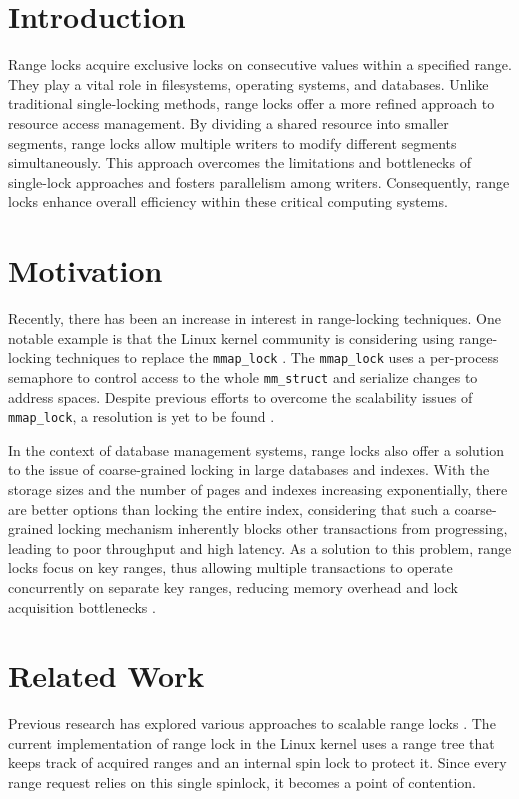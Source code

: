 \section{Introduction}

Range locks acquire exclusive locks on consecutive values within a specified range. They play a vital role in filesystems, operating systems, and databases\parencite{readerWriterLocks2017, lockingBTreeIndex2020, concurrentFileSystem2021}. Unlike traditional single-locking methods, range locks offer a more refined approach to resource access management. By dividing a shared resource into smaller segments, range locks allow multiple writers to modify different segments simultaneously. This approach overcomes the limitations and bottlenecks of single-lock approaches and fosters parallelism among writers. Consequently, range locks enhance overall efficiency within these critical computing systems.

\section{Motivation}
Recently, there has been an increase in interest in range-locking techniques. One notable example is that the Linux kernel community is considering using range-locking techniques to replace the \texttt{mmap\_lock} \parencite{readerWriterLocks2017, mapleTree2021, mmapLock2022}. The \texttt{mmap\_lock} uses a per-process semaphore to control access to the whole \texttt{mm\_struct} \parencite{mmstruct2023} and serialize changes to address spaces.  Despite previous efforts to overcome the scalability issues of \texttt{mmap\_lock}, a resolution is yet to be found \parencite{mmapLock2022}.

In the context of database management systems, range locks also offer a solution to the issue of coarse-grained locking in large databases and indexes. With the storage sizes and the number of pages and indexes increasing exponentially, there are better options than locking the entire index, considering that such a coarse-grained locking mechanism inherently blocks other transactions from progressing, leading to poor throughput and high latency. As a solution to this problem, range locks focus on key ranges, thus allowing multiple transactions to operate concurrently on separate key ranges, reducing memory overhead and lock acquisition bottlenecks \parencite{lockingBTreeIndex2020}.

\section{Related Work}
Previous research has explored various approaches to scalable range locks \parencite{linuxRangeLockImpl2013, migrationWM2023, scalableRangeLock2020}. The current implementation of range lock in the Linux kernel uses a range tree that keeps track of acquired ranges and an internal spin lock to protect it\parencite{linuxRangeLockImpl2013}. Since every range request relies on this single spinlock, it becomes a point of contention. 

